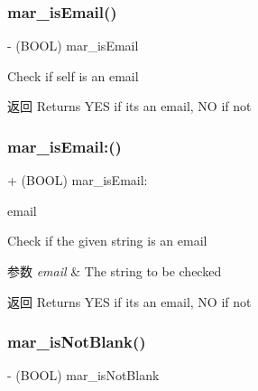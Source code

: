 \subsubsection{\texorpdfstring{mar\+\_\+is\+Email()}{mar\_isEmail()}}
{\footnotesize\ttfamily -\/ (B\+O\+OL) mar\+\_\+is\+Email \begin{DoxyParamCaption}{ }\end{DoxyParamCaption}}

Check if self is an email

\begin{DoxyReturn}{返回}
Returns Y\+ES if it\textquotesingle{}s an email, NO if not 
\end{DoxyReturn}
\mbox{\label{category_n_s_string_07_m_a_r_e_x_08_ac342a2eb96f2ff221be11746dc81d6b8}} 
\subsubsection{\texorpdfstring{mar\+\_\+is\+Email\+:()}{mar\_isEmail:()}}
{\footnotesize\ttfamily + (B\+O\+OL) mar\+\_\+is\+Email\+: \begin{DoxyParamCaption}\item[{(N\+S\+String $\ast$ \+\_\+\+Nonnull)}]{email }\end{DoxyParamCaption}}

Check if the given string is an email


\begin{DoxyParams}{参数}
{\em email} & The string to be checked\\
\hline
\end{DoxyParams}
\begin{DoxyReturn}{返回}
Returns Y\+ES if it\textquotesingle{}s an email, NO if not 
\end{DoxyReturn}
\mbox{\label{category_n_s_string_07_m_a_r_e_x_08_a0d6f8208ca5468329bcf2a39a20bf6a0}} 
\subsubsection{\texorpdfstring{mar\+\_\+is\+Not\+Blank()}{mar\_isNotBlank()}}
{\footnotesize\ttfamily -\/ (B\+O\+OL) mar\+\_\+is\+Not\+Blank \begin{DoxyParamCaption}{ }\end{DoxyParamCaption}}

